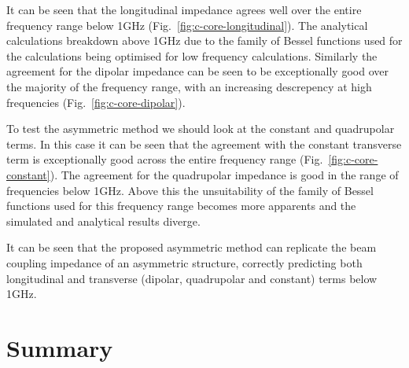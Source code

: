 \documentclass[review, number, sort&compress]{elsarticle}
\begin{document}
It can be seen that the longitudinal impedance agrees well over the entire frequency range below 1GHz (Fig.~\ref{fig:c-core-longitudinal}). The analytical calculations breakdown above 1GHz due to the family of Bessel functions used for the calculations being optimised for low frequency calculations. Similarly the agreement for the dipolar impedance can be seen to be exceptionally good over the majority of the frequency range, with an increasing descrepency at high frequencies (Fig.~\ref{fig:c-core-dipolar}).

To test the asymmetric method we should look at the constant and quadrupolar terms. In this case it can be seen that the agreement with the constant transverse term is exceptionally good across the entire frequency range (Fig.~\ref{fig:c-core-constant}). The agreement for the quadrupolar impedance is good in the range of frequencies below 1GHz. Above this the unsuitability of the family of Bessel functions used for this frequency range becomes more apparents and the simulated and analytical results diverge.

It can be seen that the proposed asymmetric method can replicate the beam coupling impedance of an asymmetric structure, correctly predicting both longitudinal and transverse (dipolar, quadrupolar and constant) terms below 1GHz. 



\section{Summary}
\label{sec:ConSum}



\end{document}
